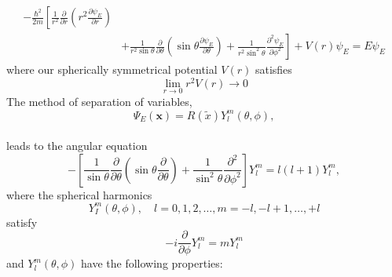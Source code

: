 \documentclass{article}
\begin{document}
\begin{equation}
\begin{aligned}
-\frac{\hbar^{2}}{2 m}\left[\frac{1}{r^{2}} \frac{\partial}{\partial r}\left(r^{2} \frac{\partial \psi_{E}}{\partial r}\right)\right.\\
&\left.+\frac{1}{r^{2} \sin \theta} \frac{\partial}{\partial \theta}\left(\sin \theta \frac{\partial \psi_{E}}{\partial \theta}\right)+\frac{1}{r^{2} \sin ^{2} \theta} \frac{\partial^{2} \psi_{E}}{\partial \phi^{2}}\right]+V(r) \psi_{E}=E \psi_{E}
\end{aligned}
\end{equation}
where our spherically symmetrical potential $V(r)$ satisfies
\begin{equation}
\lim _{r \rightarrow 0} r^{2} V(r) \rightarrow 0
\end{equation}
The method of separation of variables,
\begin{equation}
\Psi_{E}(\mathbf{x})=R(\tilde{x}) Y_{l}^{m}(\theta, \phi),
\end{equation}
\\
leads to the angular equation
\begin{equation}
-\left[\frac{1}{\sin \theta} \frac{\partial}{\partial \theta}\left(\sin \theta \frac{\partial}{\partial \theta}\right)+\frac{1}{\sin ^{2} \theta} \frac{\partial^{2}}{\partial \phi^{2}}\right] Y_{l}^{m}=l(l+1) Y_{l}^{m},
\end{equation}
where the spherical harmonics
\begin{equation}
Y_{I}^{m}(\theta, \phi), \quad l=0,1,2, \ldots, m=-l,-l+1, \ldots,+l
\end{equation}
satisfy
\begin{equation}
-i \frac{\partial}{\partial \phi} Y_{l}^{m}=m Y_{l}^{m}
\end{equation}
and $Y_{l}^{m}(\theta, \phi)$ have the following properties:
\end{document}
